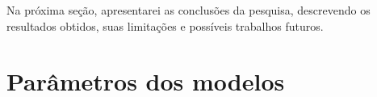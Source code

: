 \documentclass[a4paper,titlepage]{ppgi}\usepackage[]{graphicx}\usepackage[]{color}
\begin{document}
Na próxima seção, apresentarei as conclusões da pesquisa, descrevendo os
resultados obtidos, suas limitações e possíveis trabalhos futuros.






\appendix

\chapter{Parâmetros dos modelos}
\label{apendice:parametros-modelos}
\end{document}
